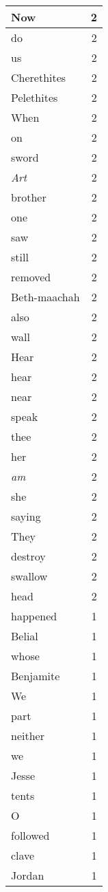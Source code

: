 \begin{center}
\begin{longtable}{l|r}
Now & 2 \\ \hline
do & 2 \\ \hline
us & 2 \\ \hline
Cherethites & 2 \\ \hline
Pelethites & 2 \\ \hline
When & 2 \\ \hline
on & 2 \\ \hline
sword & 2 \\ \hline
\emph{Art} & 2 \\ \hline
brother & 2 \\ \hline
one & 2 \\ \hline
saw & 2 \\ \hline
still & 2 \\ \hline
removed & 2 \\ \hline
Beth-maachah & 2 \\ \hline
also & 2 \\ \hline
wall & 2 \\ \hline
Hear & 2 \\ \hline
hear & 2 \\ \hline
near & 2 \\ \hline
speak & 2 \\ \hline
thee & 2 \\ \hline
her & 2 \\ \hline
\emph{am} & 2 \\ \hline
she & 2 \\ \hline
saying & 2 \\ \hline
They & 2 \\ \hline
destroy & 2 \\ \hline
swallow & 2 \\ \hline
head & 2 \\ \hline
happened & 1 \\ \hline
Belial & 1 \\ \hline
whose & 1 \\ \hline
Benjamite & 1 \\ \hline
We & 1 \\ \hline
part & 1 \\ \hline
neither & 1 \\ \hline
we & 1 \\ \hline
Jesse & 1 \\ \hline
tents & 1 \\ \hline
O & 1 \\ \hline
followed & 1 \\ \hline
clave & 1 \\ \hline
Jordan & 1 \\ \hline

\end{longtable}
\end{center}
